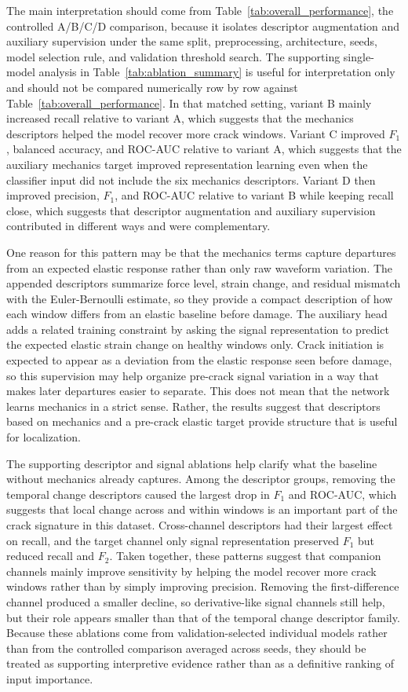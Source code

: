 \documentclass[fleqn,10pt]{wlscirep}
\begin{document}
The main interpretation should come from Table~\ref{tab:overall_performance}, the controlled A/B/C/D comparison, because it isolates descriptor augmentation and auxiliary supervision under the same split, preprocessing, architecture, seeds, model selection rule, and validation threshold search. The supporting single-model analysis in Table~\ref{tab:ablation_summary} is useful for interpretation only and should not be compared numerically row by row against Table~\ref{tab:overall_performance}. In that matched setting, variant B mainly increased recall relative to variant A, which suggests that the mechanics descriptors helped the model recover more crack windows. Variant C improved $F_1$, balanced accuracy, and ROC-AUC relative to variant A, which suggests that the auxiliary mechanics target improved representation learning even when the classifier input did not include the six mechanics descriptors. Variant D then improved precision, $F_1$, and ROC-AUC relative to variant B while keeping recall close, which suggests that descriptor augmentation and auxiliary supervision contributed in different ways and were complementary.

One reason for this pattern may be that the mechanics terms capture departures from an expected elastic response rather than only raw waveform variation. The appended descriptors summarize force level, strain change, and residual mismatch with the Euler-Bernoulli estimate, so they provide a compact description of how each window differs from an elastic baseline before damage. The auxiliary head adds a related training constraint by asking the signal representation to predict the expected elastic strain change on healthy windows only. Crack initiation is expected to appear as a deviation from the elastic response seen before damage, so this supervision may help organize pre-crack signal variation in a way that makes later departures easier to separate. This does not mean that the network learns mechanics in a strict sense. Rather, the results suggest that descriptors based on mechanics and a pre-crack elastic target provide structure that is useful for localization.

The supporting descriptor and signal ablations help clarify what the baseline without mechanics already captures. Among the descriptor groups, removing the temporal change descriptors caused the largest drop in $F_1$ and ROC-AUC, which suggests that local change across and within windows is an important part of the crack signature in this dataset. Cross-channel descriptors had their largest effect on recall, and the target channel only signal representation preserved $F_1$ but reduced recall and $F_2$. Taken together, these patterns suggest that companion channels mainly improve sensitivity by helping the model recover more crack windows rather than by simply improving precision. Removing the first-difference channel produced a smaller decline, so derivative-like signal channels still help, but their role appears smaller than that of the temporal change descriptor family. Because these ablations come from validation-selected individual models rather than from the controlled comparison averaged across seeds, they should be treated as supporting interpretive evidence rather than as a definitive ranking of input importance.
\end{document}
